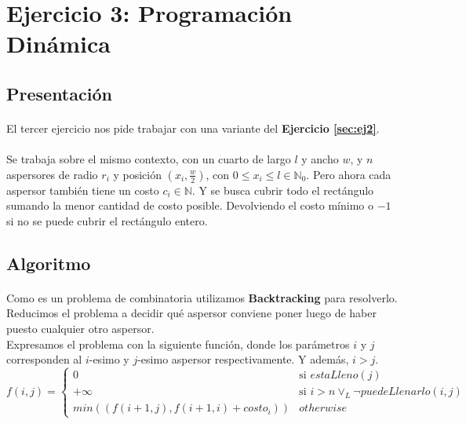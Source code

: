 \documentclass[./main.tex]{subfiles}
\begin{document}
\section{Ejercicio 3: Programación Dinámica}
\label{sec:ej3}

\subsection{Presentación}
\label{sec:ej3-intro}

\paragraph{} El tercer ejercicio nos pide trabajar con una variante del \textbf{Ejercicio \ref{sec:ej2}}.

\paragraph{} Se trabaja sobre el mismo contexto, con un cuarto de largo \(l\) y ancho \(w\), y \(n\) aspersores de radio \(r_i\) y posición \((x_i, \frac{w}{2})\), con \(0 \leq x_i \leq l \in \mathbb{N}_0\). Pero ahora cada aspersor también tiene un costo \(c_i \in \mathbb{N}\). Y se busca cubrir todo el rectángulo sumando la menor cantidad de costo posible. Devolviendo el costo mínimo o \(-1\) si no se puede cubrir el rectángulo entero.

\subsection{Algoritmo}
\label{sec:ej3-algo}

\paragraph{} Como es un problema de combinatoria utilizamos \textbf{Backtracking} para resolverlo. \\
Reducimos el problema a decidir qué aspersor conviene poner luego de haber puesto cualquier otro aspersor. \\
Expresamos el problema con la siguiente función, donde los parámetros \(i\) y \(j\) corresponden al \(i\)-esimo y \(j\)-esimo aspersor respectivamente. Y además, \(i > j\).
\begin{equation}
  f(i, j) = \begin{cases}
     0  & \text{si } estaLleno(j) \\
     +\infty & \text{si } i > n \lor_L \neg puedeLlenarlo(i, j) \\
     min((f(i+1, j), f(i+1, i) + costo_i)) & otherwise
   \end{cases}
\end{equation}
\end{document}
